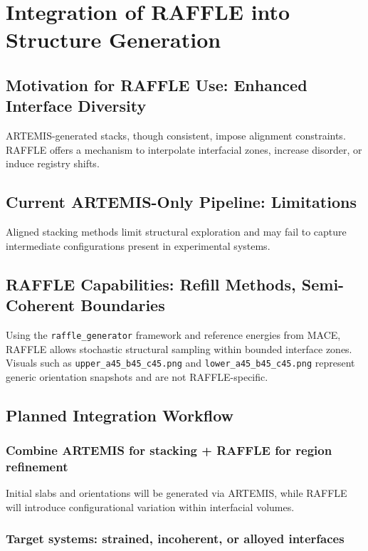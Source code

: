 \section{Integration of RAFFLE into Structure Generation}

\subsection{Motivation for RAFFLE Use: Enhanced Interface Diversity}

ARTEMIS-generated stacks, though consistent, impose alignment constraints. RAFFLE offers a mechanism to interpolate interfacial zones, increase disorder, or induce registry shifts.

\subsection{Current ARTEMIS-Only Pipeline: Limitations}

Aligned stacking methods limit structural exploration and may fail to capture intermediate configurations present in experimental systems.

\subsection{RAFFLE Capabilities: Refill Methods, Semi-Coherent Boundaries}

Using the \texttt{raffle\_generator} framework and reference energies from MACE, RAFFLE allows stochastic structural sampling within bounded interface zones. Visuals such as \texttt{upper\_a45\_b45\_c45.png} and \texttt{lower\_a45\_b45\_c45.png} represent generic orientation snapshots and are not RAFFLE-specific.

\subsection{Planned Integration Workflow}

\subsubsection{Combine ARTEMIS for stacking + RAFFLE for region refinement}

Initial slabs and orientations will be generated via ARTEMIS, while RAFFLE will introduce configurational variation within interfacial volumes.

\subsubsection{Target systems: strained, incoherent, or alloyed interfaces}

